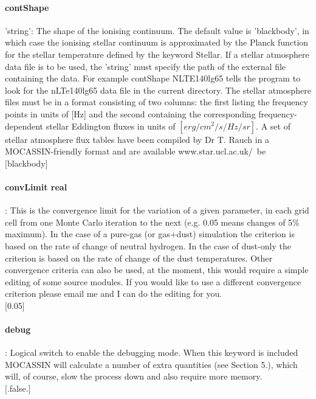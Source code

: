 \documentclass[11pt]{article}
\begin{document}
\paragraph   {contShape} 'string': The shape of the ionising continuum. The default value is 
		     'blackbody', in which case the ionising stellar continuum is 
		     approximated by the Planck function for the stellar 
		     temperature defined by the keyword Stellar. If a stellar 
		     atmosphere data file is to be used, the 'string' must specify 
		     the path of the external file containing the data. For example 
		     contShape NLTE140lg65 tells the program to look for the 
		     nLTe140lg65 data file in the current directory. The stellar 
		     atmosphere files must be in a format consisting of two columns:
		     the first listing the frequency points in units of [Hz] and 
		     the second containing the corresponding frequency-dependent 
		     stellar Eddington fluxes in units of $[erg/cm^2/s/Hz/sr]$. A set
		     of stellar atmosphere flux tables have been compiled by Dr T. Rauch
		     in a MOCASSIN-friendly format and are available www.star.ucl.ac.uk/~be\\
		     $[$blackbody$]$\\

\paragraph   {convLimit real}    : This is the convergence limit for the variation of a given 
                     parameter, in each grid cell from one Monte Carlo iteration to the 
		     next (e.g. 0.05 means changes of 5\% maximum). 
		     In the case of a pure-gas (or gas+dust) simulation the criterion 
		     is based on the rate of change of neutral hydrogen. In the case of 
		     dust-only the criterion is based on the rate of change of the 
		     dust temperatures. 
		     Other convergence criteria can also be used, at the moment, 
		     this would require a simple editing of some source modules. 
		     If you would like to use a different convergence criterion 
		     please email me and I can do the editing for you. \\
		     $[$0.05$]$\\

\paragraph   {debug}             : Logical switch to enable the debugging mode. When this 
		     keyword is included MOCASSIN will calculate a number of 
		     extra quantities (see Section 5.), which will, of course,
		     slow the process down and also require more memory. \\
		     $[$.false.$]$\\
\end{document}
